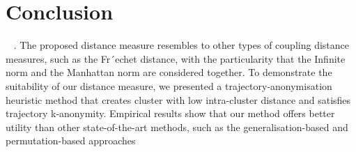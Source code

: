 \section{Conclusion }~\label{sec:conclusion}
. The proposed distance measure resembles to other types of coupling distance measures, such as the Fr´echet
distance, with the particularity that the Infinite norm and the Manhattan norm
are considered together. To demonstrate the suitability of our distance measure,
we presented a trajectory-anonymisation heuristic method that creates cluster
with low intra-cluster distance and satisfies trajectory k-anonymity. Empirical
results show that our method offers better utility than other state-of-the-art
methods, such as the generalisation-based and permutation-based approaches
